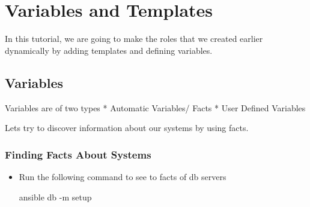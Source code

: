 \chapter{Variables and Templates}

In this  tutorial, we  are going to make the roles that we created earlier dynamically by adding templates and defining variables.

\section{Variables}

Variables are of two types
  * Automatic Variables/ Facts
  * User Defined Variables

Lets try to discover information about our systems by using facts.

\subsection{Finding Facts About Systems}

\begin{itemize}
\item Run the following command to see to facts of db servers\newline
\begin{code}
  ansible db -m setup
\end{code}
\end{itemize}

